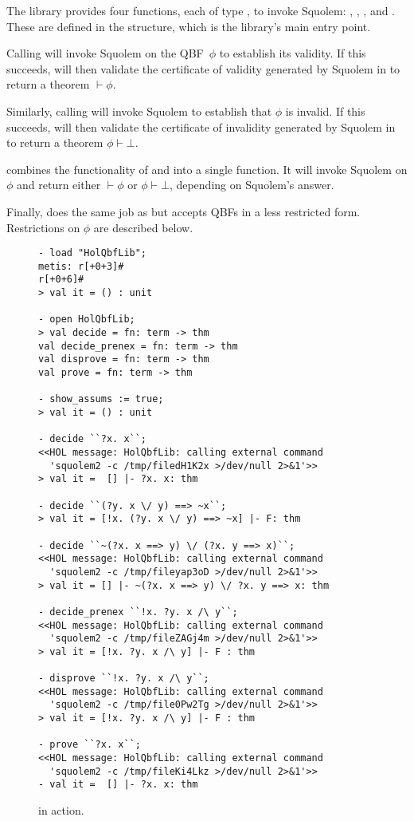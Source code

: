 The library provides four functions, each of type , to invoke
Squolem: , , , and .  These
are defined in the  structure, which is the library's main entry
point.

Calling  will invoke Squolem on the QBF~$\phi$ to
establish its validity.  If this succeeds,  will then
validate the certificate of validity generated by Squolem in \HOL{} to
return a theorem $\vdash \phi$.

Similarly, calling  will invoke Squolem to
establish that $\phi$ is invalid.  If this succeeds, 
will then validate the certificate of invalidity generated by Squolem
in \HOL{} to return a theorem $\phi \vdash \bot$.

 combines the functionality of  and
 into a single function.  It will invoke Squolem on
$\phi$ and return either $\vdash \phi$ or $\phi \vdash \bot$,
depending on Squolem's answer.

Finally,  does the same job as  but accepts QBFs
in a less restricted form. Restrictions on $\phi$ are described below.

\begin{figure}
\begin{session}
\begin{verbatim}
- load "HolQbfLib";
metis: r[+0+3]#
r[+0+6]#
> val it = () : unit

- open HolQbfLib;
> val decide = fn: term -> thm
val decide_prenex = fn: term -> thm
val disprove = fn: term -> thm
val prove = fn: term -> thm

- show_assums := true;
> val it = () : unit

- decide ``?x. x``;
<<HOL message: HolQbfLib: calling external command
  'squolem2 -c /tmp/filedH1K2x >/dev/null 2>&1'>>
> val it =  [] |- ?x. x: thm

- decide ``(?y. x \/ y) ==> ~x``;
> val it = [!x. (?y. x \/ y) ==> ~x] |- F: thm

- decide ``~(?x. x ==> y) \/ (?x. y ==> x)``;
<<HOL message: HolQbfLib: calling external command
  'squolem2 -c /tmp/fileyap3oD >/dev/null 2>&1'>>
> val it = [] |- ~(?x. x ==> y) \/ ?x. y ==> x: thm

- decide_prenex ``!x. ?y. x /\ y``;
<<HOL message: HolQbfLib: calling external command
  'squolem2 -c /tmp/fileZAGj4m >/dev/null 2>&1'>>
> val it = [!x. ?y. x /\ y] |- F : thm

- disprove ``!x. ?y. x /\ y``;
<<HOL message: HolQbfLib: calling external command
  'squolem2 -c /tmp/file0Pw2Tg >/dev/null 2>&1'>>
> val it = [!x. ?y. x /\ y] |- F : thm

- prove ``?x. x``;
<<HOL message: HolQbfLib: calling external command
  'squolem2 -c /tmp/fileKi4Lkz >/dev/null 2>&1'>>
- val it =  [] |- ?x. x: thm
\end{verbatim}
\end{session}
\caption{ in action.}
\end{figure}

